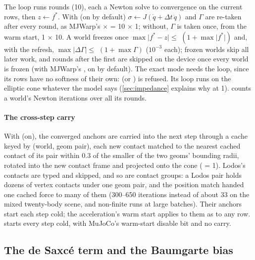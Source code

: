 The loop runs  rounds (10), each a Newton solve to convergence on the current rows, then $z \gets f^*$. With  (on by default) $\sigma \gets J(\dot q + \Delta t\,\ddot q)$ and $\Gamma$ are re-taken after every round, as MJWarp's  $\times$  = 10 $\times$ 1; without, $\Gamma$ is taken once, from the warm start, 1 $\times$ 10. A world freezes once $\max\lvert f^* - z\rvert \le$  $(1 + \max\lvert f^*\rvert)$ and, with the refresh, $\max\lvert\Delta\Gamma\rvert \le$  $(1 + \max\Gamma)$ ($10^{-3}$ each); frozen worlds skip all later work, and rounds after the first are skipped on the device once every world is frozen (with MJWarp's , on by default). The exact mode needs the loop, since its rows have no softness of their own:  (or ) is refused. Its loop runs on the elliptic cone whatever the model says (\cref{sec:impedance} explains why at  1).  counts a world's Newton iterations over all its rounds.

\paragraph{The cross-step carry} With  (on), the converged anchors are carried into the next step through a cache keyed by (world, geom pair), each new contact matched to the nearest cached contact of its pair within 0.3 of the smaller of the two geoms' bounding radii, rotated into the new contact frame and projected onto the cone ( = 1). Lodos's contacts are typed  and skipped, and so are contact groups: a Lodos pair holds dozens of vertex contacts under one geom pair, and the position match handed one cached force to many of them (300--650 iterations instead of about 33 on the mixed twenty-body scene, and non-finite runs at large batches). Their anchors start each step cold; the acceleration's warm start applies to them as to any row.  starts every step cold, with MuJoCo's warm-start disable bit and no carry.

\subsection{The de Saxc\'e term and the Baumgarte bias}\label{sec:desaxce}

